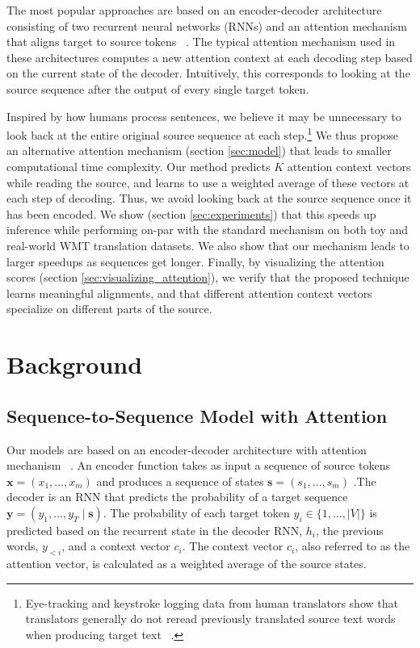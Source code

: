 \documentclass[11pt,letterpaper]{article}
\begin{document}
The most popular approaches are based on an encoder-decoder architecture consisting of two recurrent neural networks (RNNs) and an attention mechanism that aligns target to source tokens ~\cite{Bahdanau:2014, Luong:2015}. The typical attention mechanism used in these architectures computes a new attention context at each decoding step based on the current state of the decoder. Intuitively, this corresponds to looking at the source sequence after the output of every single target token. 


Inspired by how humans process sentences, we believe it may be unnecessary to look back at the entire original source sequence at each step.\footnote{Eye-tracking and keystroke logging data from human translators show that translators generally do not reread previously translated source text words when producing target text ~\cite{carl2011taxonomy}.}  We thus propose an alternative attention mechanism (section \ref{sec:model}) that leads to smaller computational time complexity. Our method predicts $K$ attention context vectors while reading the source, and learns to use a weighted average of these vectors at each step of decoding. Thus, we avoid looking back at the source sequence once it has been encoded. We show (section \ref{sec:experiments}) that this speeds up inference while performing on-par with the standard mechanism on both toy and real-world WMT translation datasets. We also show that our mechanism leads to larger speedups as sequences get longer. Finally, by visualizing the attention scores (section \ref{sec:visualizing_attention}), we verify that the proposed technique learns meaningful alignments, and that different attention context vectors specialize on different parts of the source.

\section{Background}
\label{sec:background}
\subsection{Sequence-to-Sequence Model with Attention}

Our models are based on an encoder-decoder architecture with attention mechanism ~\cite{Bahdanau:2014,Luong:2015}. An encoder function takes as input a sequence of source tokens $\mathbf{x} = (x_1, ..., x_m)$ and produces a sequence of states $\mathbf{s} = (s_1, ..., s_m)$ .The decoder is an RNN that predicts the probability of a target sequence $\mathbf{y} = (y_1, ..., y_T \mid \mathbf{s})$. The probability of each target token $y_i \in \{1, ... ,|V|\}$ is predicted based on the recurrent state in the decoder RNN, $h_i$, the previous words, $y_{<i}$, and a context vector $c_i$. The context vector $c_i$, also referred to as the attention vector, is calculated as a weighted average of the source states.
\end{document}
